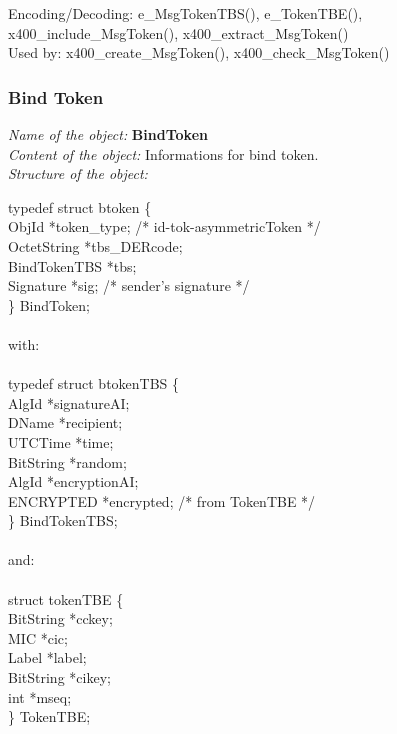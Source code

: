 Encoding/Decoding: e\_MsgTokenTBS(), e\_TokenTBE(),
x400\_include\_Msg\-To\-ken(), x400\_extract\_MsgToken() \\
Used by: x400\_create\_MsgToken(), x400\_check\_MsgToken()

\subsubsection{Bind Token}
\label{x4_BTOC}
{\em Name of the object:} {\bf BindToken} \\
{\em Content of the object:} Informations for bind token. \\
{\em Structure of the object:}

{\small
\btab
\1 typedef struct btoken \{ \\
\2      ObjId  \2 *token\_type; /* id-tok-asymmetricToken */ \\
\2      OctetString  \2 *tbs\_DERcode; \\
\2      BindTokenTBS \2 *tbs; \\
\2      Signature \2    *sig; /* sender's signature */ \\
\1 \} BindToken; \\ \\
with: \\ \\
\1 typedef struct btokenTBS \{  \\
\2     AlgId     \2   *signatureAI; \\
\2     DName      \2   *recipient;   \\
\2     UTCTime   \2   *time;        \\
\2     BitString \2   *random;      \\
\2     AlgId     \2   *encryptionAI;\\
\2     ENCRYPTED \2   *encrypted; /* from TokenTBE */  \\
\1 \} BindTokenTBS; \\ \\
and: \\ \\
\1 struct tokenTBE \{ \\
\2     BitString \2   *cckey; \\
\2     MIC       \2   *cic;   \\
\2     Label     \2   *label; \\
\2     BitString \2   *cikey; \\
\2     int       \2   *mseq;  \\
\1 \} TokenTBE; \\
\etab
}

